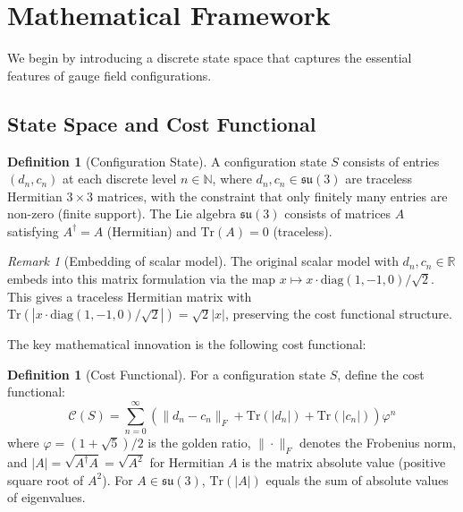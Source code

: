 \documentclass[11pt]{article}
\numberwithin{equation}{section}
\theoremstyle{definition}
\newtheorem{definition}[theorem]{Definition}
\theoremstyle{remark}
\newtheorem{remark}[theorem]{Remark}
\begin{document}
\section{Mathematical Framework}
\label{sec:framework}

We begin by introducing a discrete state space that captures the essential features of gauge field configurations.

\subsection{State Space and Cost Functional}

\begin{definition}[Configuration State]
A configuration state $S$ consists of entries $(d_n, c_n)$ at each discrete level $n \in \mathbb{N}$, where $d_n, c_n \in \mathfrak{su}(3)$ are traceless Hermitian $3 \times 3$ matrices, with the constraint that only finitely many entries are non-zero (finite support). The Lie algebra $\mathfrak{su}(3)$ consists of matrices $A$ satisfying $A^\dagger = A$ (Hermitian) and $\text{Tr}(A) = 0$ (traceless).
\end{definition}

\begin{remark}[Embedding of scalar model]
The original scalar model with $d_n, c_n \in \mathbb{R}$ embeds into this matrix formulation via the map $x \mapsto x \cdot \text{diag}(1,-1,0)/\sqrt{2}$. This gives a traceless Hermitian matrix with $\text{Tr}(|x \cdot \text{diag}(1,-1,0)/\sqrt{2}|) = \sqrt{2}|x|$, preserving the cost functional structure.
\end{remark}

The key mathematical innovation is the following cost functional:

\begin{definition}[Cost Functional]
For a configuration state $S$, define the cost functional:
\begin{equation}
\mathcal{C}(S) = \sum_{n=0}^{\infty} \left(\|d_n - c_n\|_F + \text{Tr}(|d_n|) + \text{Tr}(|c_n|)\right) \varphi^n
\end{equation}
where $\varphi = (1+\sqrt{5})/2$ is the golden ratio, $\|\cdot\|_F$ denotes the Frobenius norm, and $|A| = \sqrt{A^\dagger A} = \sqrt{A^2}$ for Hermitian $A$ is the matrix absolute value (positive square root of $A^2$). For $A \in \mathfrak{su}(3)$, $\text{Tr}(|A|)$ equals the sum of absolute values of eigenvalues.
\end{definition}
\end{document}
